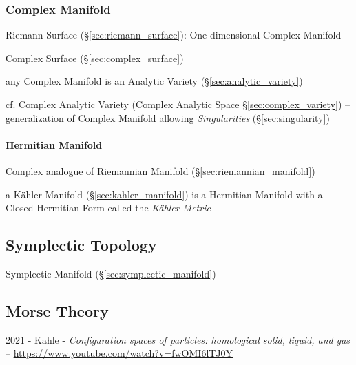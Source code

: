 \subsubsection{Complex Manifold}\label{sec:complex_manifold}

Riemann Surface (\S\ref{sec:riemann_surface}): One-dimensional Complex
Manifold


Complex Surface (\S\ref{sec:complex_surface})

any Complex Manifold is an Analytic Variety (\S\ref{sec:analytic_variety})

cf. Complex Analytic Variety (Complex Analytic Space
\S\ref{sec:complex_variety}) -- generalization of Complex Manifold allowing
\emph{Singularities} (\S\ref{sec:singularity})



\paragraph{Hermitian Manifold}\label{sec:hermitian_manifold}\hfill

Complex analogue of Riemannian Manifold (\S\ref{sec:riemannian_manifold})

a K\"ahler Manifold (\S\ref{sec:kahler_manifold}) is a Hermitian
Manifold with a Closed Hermitian Form called the \emph{K\"ahler
  Metric} %



\subsection{Symplectic Topology}\label{sec:symplectic_topology}

Symplectic Manifold (\S\ref{sec:symplectic_manifold})



\subsection{Morse Theory}\label{sec:morse_theory}

2021 - Kahle -
\emph{Configuration spaces of particles: homological solid, liquid, and gas}
-- \url{https://www.youtube.com/watch?v=fwOMI6lTJ0Y}

